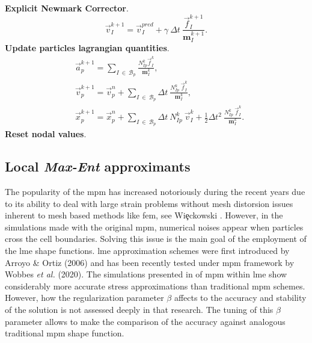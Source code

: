 \documentclass[preprint,12pt,a4paper]{elsarticle}
\newcommand{\tens}[1]{
  \ensuremath{\mathbf{{#1}}}
}
\begin{document}
\begin{algorithm}
\begin{algorithmic}[1]
    \STATE \textbf{Explicit Newmark Corrector}.
    \begin{equation*}
      \vec{v}_{I}^{k+1} = \vec{v}_{I}^{pred} + \gamma\ \Delta t\ \frac{\vec{f}_{I}^{k+1}}{\tens{m}_I^{k+1}}.
    \end{equation*}
    \STATE \textbf{Update particles lagrangian quantities}.
    \begin{align*}
      &\vec{a}_p^{k+1} = \sum_{I\ \in\ \mathcal{B}_p} \frac{N_{Ip}^k\vec{f}_{I}^{k}}{\tens{m}_I^k},\\
      &\vec{v}_p^{k+1} = \vec{v}_p^n + \sum_{I\ \in\ \mathcal{B}_p} \Delta t\
        \frac{N_{Ip}^k\
        \vec{f}_{I}^{k}}{\tens{m}_I^k},\\
      &\vec{x}_p^{k+1} = \vec{x}_p^n + \sum_{I\ \in\ \mathcal{B}_p} \Delta t\
         N_{Ip}^k\ \vec{v}_{I}^{k} +
        \frac{1}{2}\Delta t^2\ \frac{N_{Ip}^k\
        \vec{f}_{I}^{k}}{\tens{m}_I^k}.
    \end{align*}
    \STATE \textbf{Reset nodal values}.
  \end{algorithmic}
\end{algorithm}

\subsection{Local \textit{Max-Ent} approximants}
\label{sec:local-max-ent}
The popularity of the \acrshort{mpm} has increased notoriously during
the recent years due to its ability to deal with large strain problems without mesh distorsion issues inherent to mesh based methods like \acrshort{fem}, see Wi{\c{e}}ckowski \cite{Wieckowski2004}. However, in the simulations
made with the original \acrshort{mpm}, numerical noises appear when particles cross the cell boundaries. Solving this issue is the main goal of the employment of the \acrshort{lme} shape functions.
\acrfull{lme} approximation schemes were
first introduced by Arroyo \& Ortiz (2006)\cite{Arroyo2006} and has been recently tested under \acrshort{mpm} framework by Wobbes {\it et al.} (2020)\cite{Wobbes2020}. The simulations presented in \cite{Wobbes2020} of \acrshort{mpm} within \acrshort{lme} show considerably more accurate stress approximations than traditional \acrshort{mpm} schemes. However, how the regularization parameter $\beta$ affects to the accuracy and stability of the solution is not assessed deeply in that research. The tuning of this $\beta$ parameter allows to make the comparison of the accuracy against analogous traditional \acrshort{mpm} shape function.
\end{document}

